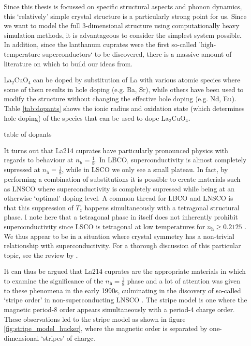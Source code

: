 Since this thesis is focussed on specific structural aspects and phonon dynamics, this `relatively' simple crystal structure is a particularly strong point for us. Since we want to model the full 3-dimensional structure using computationally heavy simulation methods, it is advantageous to consider the simplest system possible. In addition, since the lanthanum cuprates were the first so-called 'high-temperature superconductors` to be discovered, there is a massive amount of literature on which to build our ideas from.

La$_2$CuO$_4$ can be doped by substitution of La with various atomic species where some of them results in hole doping (e.g. Ba, Sr), while others have been used to modify the structure without changing the effective hole doping (e.g. Nd, Eu). Table \ref{tab:dopants} shows the ionic radius and oxidation state (which determines hole doping) of the species that can be used to dope La$_2$CuO$_4$.

\begin{table}
    \caption{table of dopants \cite{Hucker2012}}
    \label{tab:dopants}
\end{table}

It turns out that La214 cuprates have particularly pronounced physics with regards to behaviour at $n_\text{h} = \frac{1}{8}$. In LBCO, superconductivity is almost completely supressed at $n_\text{h} = \frac{1}{8}$, while in LSCO we only see a small plateau. In fact, by performing a combination of substitutions it is possible to create materials such as LNSCO where superconductivity is completely supressed while being at an otherwise `optimal' doping level. A common thread for LBCO and LNSCO is that this suppression of $T_\text{c}$ happens simultaneously with a tetragonal structural phase. I note here that a tetragonal phase in itself does not inherently prohibit superconductivity since LSCO is tetragonal at low temperatures for $n_\text{h} \geq 0.2125$ \cite{Radaelli1994a}. We thus appear to be in a situation where crystal symmetry has a non-trivial relationship with superconductivity. For a thorough discussion of this particular topic, see the review by \citeauthor{Hucker2012} \cite{Hucker2012}.

It can thus be argued that La214 cuprates are the appropriate materials in which to examine the significance of the $n_\text{h} = \frac{1}{8}$ phase and a lot of attention was given to these phenomena in the early 1990s, culminating in the discovery of so-called `stripe order' in non-superconducting LNSCO \cite{Tranquada1995}. The stripe model is one where the magnetic period-8 order appears simultaneously with a period-4 charge order. These observations led to the stripe model as shown in figure \ref{fig:stripe_model_hucker}, where the magnetic order is separated by one-dimensional `stripes' of charge. 

